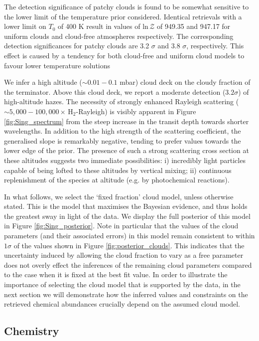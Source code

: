 \documentclass[fleqn,usenatbib]{mnras}
\begin{document}
The detection significance of patchy clouds is found to be somewhat sensitive to the lower limit of the temperature prior considered. Identical retrievals with a lower limit on $T_0$ of 400 K result in values of $\mathrm{ln} \, \mathcal{Z}$ of 949.35 and 947.17 for uniform clouds and cloud-free atmospheres respectively. The corresponding detection significances for  patchy clouds are 3.2 $\sigma$ and 3.8 $\sigma$, respectively. This effect is caused by a tendency for both cloud-free and uniform cloud models to favour lower temperature solutions \citep[e.g., see][]{Tsiaras2016a}

We infer a high altitude ($\sim 0.01-0.1$ mbar) cloud deck on the cloudy fraction of the terminator. Above this cloud deck, we report a moderate detection ($3.2\sigma$) of high-altitude hazes. The necessity of strongly enhanced Rayleigh scattering ($\sim 5,000-100,000 \times \, \mathrm{H_{2}}$-Rayleigh) is visibly apparent in Figure \ref{fig:Sing_spectrum} from the steep increase in the transit depth towards shorter wavelengths. In addition to the high strength of the scattering coefficient, the generalised slope is remarkably negative, tending to prefer values towards the lower edge of the prior. The presence of such a strong scattering cross section at these altitudes suggests two immediate possibilities: i) incredibly light particles capable of being lofted to these altitudes by vertical mixing; ii) continuous replenishment of the species at altitude (e.g. by photochemical reactions).

In what follows, we select the `fixed fraction' cloud model, unless otherwise stated. This is the model that maximises the Bayesian evidence, and thus holds the greatest sway in light of the data. We display the full posterior of this model in Figure \ref{fig:Sing_posterior}. Note in particular that the values of the cloud parameters (and their associated errors) in this model remain consistent to within $1\sigma$ of the values shown in Figure \ref{fig:posterior_clouds}. This indicates that the uncertainty induced by allowing the cloud fraction to vary as a free parameter does not overly effect the inferences of the remaining cloud parameters compared to the case when it is fixed at the best fit value. In order to illustrate the importance of selecting the cloud model that is supported by the data, in the next section we will demonstrate how the inferred values and constraints on the retrieved chemical abundances crucially depend on the assumed cloud model.

\subsection{Chemistry}\label{subsection:results_chemistry}
\end{document}
